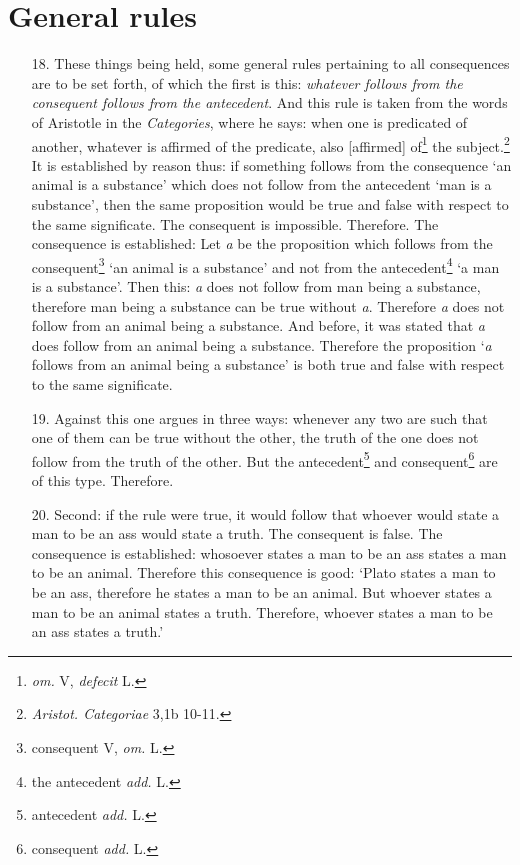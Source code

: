 \documentclass[]{article}
\begin{document}
\section{General rules}
\begin{enumerate}
	\item[18.] These things being held, some general rules pertaining to all consequences are to be set forth, of which the first is this: \textit{whatever follows from the consequent follows from the antecedent}. And this rule is taken from the words of Aristotle in the \textit{Categories}, where he says: when one is predicated of another, whatever is affirmed of the predicate, also [affirmed] of\footnote{\textit{om.} V, \textit{defecit} L.} the subject.\footnote{\textit{Aristot. Categoriae} 3,1b 10-11.} It is established by reason thus: if something follows from the consequence `an animal is a substance' which does not follow from the antecedent `man is a substance', then the same proposition would be true and false with respect to the same significate. The consequent is impossible. Therefore.  The consequence is established: Let \textit{a} be the proposition which follows from the consequent\footnote{consequent V, \textit{om.} L.} `an animal is a substance' and not from the antecedent\footnote{the antecedent \textit{add.} L.} `a man is a substance'. Then this: \textit{a} does not follow from man being a substance, therefore man being a substance can be true without \textit{a}. Therefore \textit{a} does not follow from an animal being a substance. And before, it was stated that \textit{a} does follow from an animal being a substance. Therefore the proposition `\textit{a} follows from an animal being a substance' is both true and false with respect to the same significate.
	\item[19.] Against this one argues in three ways: whenever any two are such that one of them can be true without the other, the truth of the one does not follow from the truth of the other. But the antecedent\footnote{antecedent \textit{add.} L.} and consequent\footnote{consequent \textit{add.} L.} are of this type. Therefore.
	\item[20.] Second: if the rule were true, it would follow that whoever would state a man to be an ass would state a truth. The consequent is false. The consequence is established: whosoever states a man to be an ass states a man to be an animal. Therefore this consequence is good: `Plato states a man to be an ass, therefore he states a man to be an animal. But whoever states a man to be an animal states a truth. Therefore, whoever states a man to be an ass states a truth.'

\end{enumerate}
\end{document}
